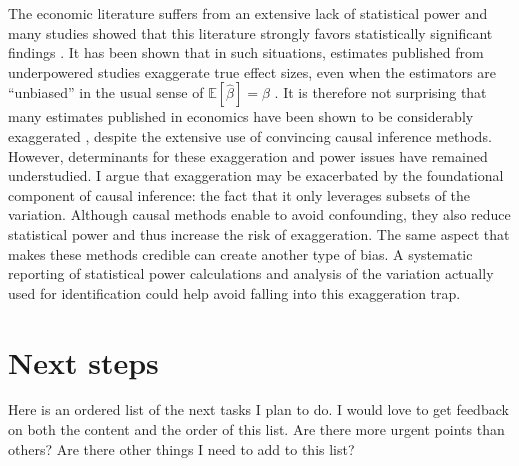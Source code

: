 \documentclass[usletter, 12pt]{article}
\begin{document}
	The economic literature suffers from an extensive lack of statistical power \citep{ioannidis_power_2017} and many studies showed that this literature strongly favors statistically significant findings \citep[for instance]{rosenthal_file_1979, andrews_identification_2019, abadie_statistical_2020, brodeur_methods_2020}. It has been shown that in such situations, estimates published from underpowered studies exaggerate true effect sizes, even when the estimators are ``unbiased'' in the usual sense of $\mathbb{E}[\hat{\beta}] = \beta$ \citep{ioannidis_why_2008, gelman_beyond_2014, lu_note_2019, zwet_significance_2021}. It is therefore not surprising that many estimates published in economics have been shown to be considerably exaggerated  \citep{camerer_evaluating_2016, ioannidis_power_2017}, despite the extensive use of convincing causal inference methods.  However, determinants for these exaggeration and power issues have remained understudied. I argue that exaggeration may be exacerbated by the foundational component of causal inference: the fact that it only leverages subsets of the variation. Although causal methods enable to avoid confounding, they also reduce statistical power and thus increase the risk of exaggeration. The same aspect that makes these methods credible can create another type of bias. A systematic reporting of statistical power calculations and analysis of the variation actually used for identification could help avoid falling into this exaggeration trap.
	
	



\section{Next steps} \label{next_steps}

	Here is an ordered list of the next tasks I plan to do. I would love to get feedback on both the content and the order of this list. Are there more urgent points than others? Are there other things I need to add to this list?\\
\end{document}
